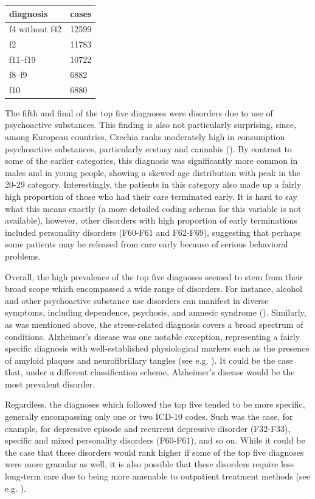 \documentclass[
  openany]{book}
\theoremstyle{definition}
\theoremstyle{definition}
\theoremstyle{definition}
\theoremstyle{definition}
\theoremstyle{remark}
\begin{document}
\begin{tabular}{ll}
\toprule
diagnosis & cases\\
\midrule
f4 without f42 & 12599\\
f2 & 11783\\
f11–f19 & 10722\\
f8–f9 & 6882\\
f10 & 6880\\
\bottomrule
\end{tabular}

The fifth and final of the top five diagnoses were disorders due to use of psychoactive substances. This finding is also not particularly surprising, since, among European countries, Czechia ranks moderately high in consumption psychoactive substances, particularly ecstasy and cannabis (). By contrast to some of the earlier categories, this diagnosis was significantly more common in males and in young people, showing a skewed age distribution with peak in the 20-29 category. Interestingly, the patients in this category also made up a fairly high proportion of those who had their care terminated early. It is hard to say what this means exactly (a more detailed coding schema for this variable is not available), however, other disorders with high proportion of early terminations included personality disorders (F60-F61 and F62-F69), suggesting that perhaps some patients may be released from care early because of serious behavioral problems.

Overall, the high prevalence of the top five diagnoses seemed to stem from their broad scope which encompassed a wide range of disorders. For instance, alcohol and other psychoactive substance use disorders can manifest in diverse symptoms, including dependence, psychosis, and amnesic syndrome (). Similarly, as was mentioned above, the stress-related diagnosis covers a broad spectrum of conditions. Alzheimer's disease was one notable exception, representing a fairly specific diagnosis with well-established physiological markers such as the presence of amyloid plaques and neurofibrillary tangles (see e.g. ). It could be the case that, under a different classification scheme, Alzheimer's disease would be the most prevalent disorder.

Regardless, the diagnoses which followed the top five tended to be more specific, generally encompassing only one or two ICD-10 codes. Such was the case, for example, for depressive episode and recurrent depressive disorder (F32-F33), specific and mixed personality disorders (F60-F61), and so on. While it could be the case that these disorders would rank higher if some of the top five diagnoses were more granular as well, it is also possible that these disorders require less long-term care due to being more amenable to outpatient treatment methods (see e.g. ).
\end{document}
